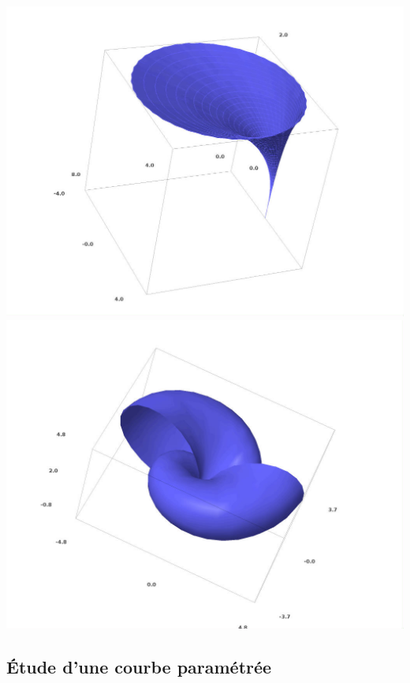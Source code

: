 \documentclass[class=report,crop=false]{standalone}
\begin{document}
\begin{center}
\includegraphics[scale=0.2]{figures/surface_4.jpg} 
\includegraphics[scale=0.2]{figures/surface_5.jpg}  
\end{center}




\subsection{\'Etude d'une courbe paramétrée}
\end{document}
